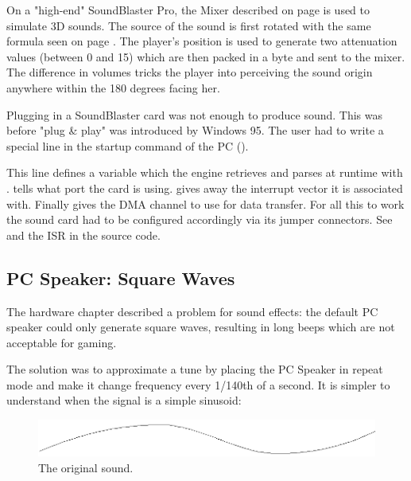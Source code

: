 On a "high-end" SoundBlaster Pro, the Mixer described on page \pageref{sbmixerpage} is used to simulate 3D sounds. The source of the sound is first rotated with the same formula seen on page \pageref{rotatematrix}. The player's position is used to generate two attenuation values (between 0 and 15) which are then packed in a byte and sent to the mixer. The difference in volumes tricks the player into perceiving the sound origin anywhere within the 180 degrees facing her.\\
\par 
\begin{minipage}{\textwidth}

\end{minipage}
\par
{} Plugging in a SoundBlaster card was not enough to produce sound. This was before "plug \& play" was introduced by Windows 95. The user had to write a special line in the startup command of the PC ().\\
\par 
\begin{minipage}{\textwidth}

\end{minipage}
\par
This line defines a variable  which the engine retrieves and parses at runtime with .  tells what port the card is using.  gives away the interrupt vector it is associated with. Finally  gives the DMA channel to use for data transfer. For all this to work the sound card had to be configured accordingly via its jumper connectors. See  and the ISR  in the source code.












 
\subsection{PC Speaker: Square Waves}
The hardware chapter described a problem for sound effects: the default PC speaker could only generate square waves, resulting in long beeps which are not acceptable for gaming.\\
\par
The solution was to approximate a tune by placing the PC Speaker in repeat mode and make it change frequency every 1/140th of a second. It is simpler to understand when the signal is a simple sinusoid:
\par
\begin{figure}[H]
\centering
 \includegraphics[width=\textwidth]{imgs/drawings/pwm/sinuois.png}
 \caption{The original sound.}
 \end{figure}
\par

